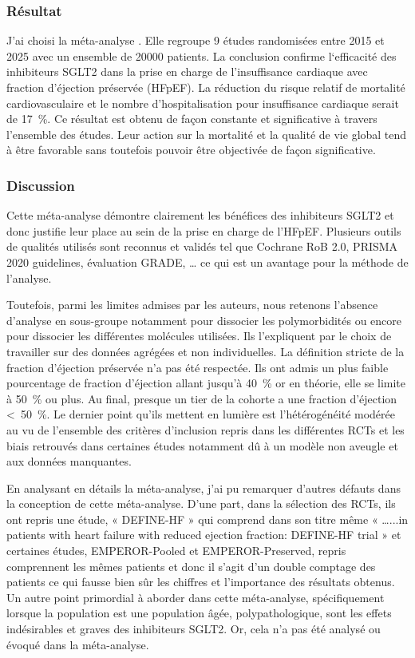 \subsubsection{Résultat}
J’ai choisi la méta-analyse \textcite{minisy2025role}. Elle regroupe 9 études randomisées entre 2015 et 2025 avec un ensemble de \num{20000} patients. La conclusion confirme l‘efficacité des inhibiteurs SGLT2 dans la prise en charge de l’insuffisance cardiaque avec fraction d’éjection préservée (HFpEF). La réduction du risque relatif de mortalité cardiovasculaire et le nombre d’hospitalisation pour insuffisance cardiaque serait de \qty{17}{\percent}. Ce résultat est obtenu de façon constante et significative à travers l’ensemble des études. Leur action sur la mortalité et la qualité de vie global tend à être favorable sans toutefois pouvoir être objectivée de façon significative. 

\subsubsection{Discussion}
Cette méta-analyse démontre clairement les bénéfices des inhibiteurs SGLT2 et donc justifie leur place au sein de la prise en charge de l’HFpEF. Plusieurs outils de qualités utilisés sont reconnus et validés tel que Cochrane RoB 2.0, PRISMA 2020 guidelines, évaluation GRADE, … ce qui est un avantage pour la méthode de l’analyse.

Toutefois, parmi les limites admises par les auteurs, nous retenons l’absence d’analyse en sous-groupe notamment pour dissocier les polymorbidités ou encore pour dissocier les différentes molécules utilisées. Ils l’expliquent par le choix de travailler sur des données agrégées et non individuelles. La définition stricte de la fraction d’éjection préservée n’a pas été respectée. Ils ont admis un plus faible pourcentage de fraction d’éjection allant jusqu’à \qty{40}{\percent} or en théorie, elle se limite à \qty{50}{\percent} ou plus. Au final, presque un tier de la cohorte a une fraction d’éjection <~\qty{50}{\percent}. Le dernier point qu’ils mettent en lumière est l’hétérogénéité modérée au vu de l’ensemble des critères d’inclusion repris dans les différentes RCTs et les biais retrouvés dans certaines études notamment dû à un modèle non aveugle et aux données manquantes.

En analysant en détails la méta-analyse, j’ai pu remarquer d’autres défauts dans la conception de cette méta-analyse. D’une part, dans la sélection des RCTs, ils ont repris une étude, « DEFINE-HF » qui comprend dans son titre même « …...in patients with heart failure with reduced ejection fraction: DEFINE-HF trial » et certaines études, EMPEROR-Pooled et EMPEROR-Preserved, repris comprennent les mêmes patients et donc il s’agit d’un double comptage des patients ce qui fausse bien sûr les chiffres et l’importance des résultats obtenus. Un autre point primordial à aborder dans cette méta-analyse, spécifiquement lorsque la population est une population âgée, polypathologique, sont les effets indésirables et graves des inhibiteurs SGLT2. Or, cela n’a pas été analysé ou évoqué dans la méta-analyse.

